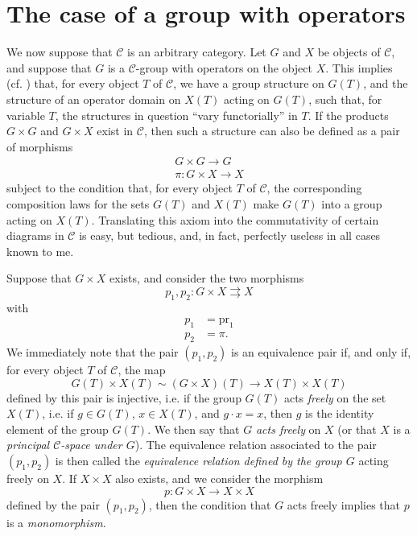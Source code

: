 \documentclass{article}
\renewcommand{\cal}[1]{{\mathcal{#1}}}
\newcommand{\pr}{\mathrm{pr}}
\newcommand{\oldpage}[1]{\marginpar{\footnotesize$\Big\vert$ \textit{p.~#1}}}
\begin{document}
\section{The case of a group with operators}
\label{3}

We now suppose that $\cal{C}$ is an arbitrary category.
Let $G$ and $X$ be objects of $\cal{C}$, and suppose that $G$ is a $\cal{C}$-group with operators on the object $X$.
This implies (cf. \cite[\S A.1]{2}) that, for every object $T$ of $\cal{C}$, we have a group structure on $G(T)$, and the structure of an operator domain on $X(T)$ acting on $G(T)$, such that, for variable $T$, the structures in question ``vary functorially'' in $T$.
If the products $G\times G$ and $G\times X$ exist in $\cal{C}$, then such a structure can also be defined as a pair of morphisms
\[
  \begin{gathered}
    G\times G\to G
  \\\pi\colon G\times X\to X
  \end{gathered}
\]
subject to the condition that, for every object $T$ of $\cal{C}$, the corresponding composition laws for the sets $G(T)$ and $X(T)$ make $G(T)$ into a group acting on $X(T)$.
Translating this axiom into the commutativity of certain diagrams in $\cal{C}$ is easy, but tedious, and, in fact, perfectly useless in all cases known to me.

Suppose that $G\times X$ exists, and consider the two morphisms
\[
  p_1,p_2\colon G\times X\rightrightarrows X
\]
with
\oldpage{212-07}
\[
  \begin{aligned}
    p_1 &= \pr_1
  \\p_2 &= \pi.
  \end{aligned}
\]
We immediately note that the pair $(p_1,p_2)$ is an equivalence pair if, and only if, for every object $T$ of $\cal{C}$, the map
\[
  G(T)\times X(T) \sim (G\times X)(T) \to X(T)\times X(T)
\]
defined by this pair is injective, i.e. if the group $G(T)$ acts \emph{freely} on the set $X(T)$, i.e. if $g\in G(T)$, $x\in X(T)$, and $g\cdot x=x$, then $g$ is the identity element of the group $G(T)$.
We then say that $G$ \emph{acts freely} on $X$ (or that $X$ is a \emph{principal $\cal{C}$-space under $G$}).
The equivalence relation associated to the pair $(p_1,p_2)$ is then called the \emph{equivalence relation defined by the group $G$} acting freely on $X$.
If $X\times X$ also exists, and we consider the morphism
\[
  p\colon G\times X\to X\times X
\]
defined by the pair $(p_1,p_2)$, then the condition that $G$ acts freely implies that $p$ is a \emph{monomorphism}.
\end{document}
